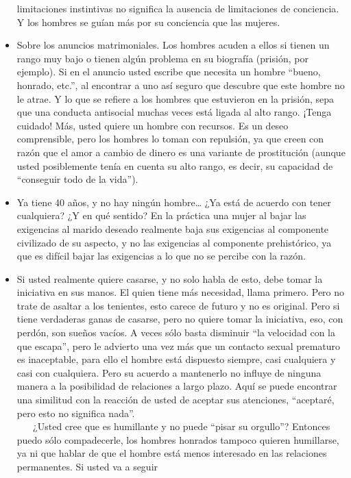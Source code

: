 \begin{itemize}
  limitaciones instintivas no significa la ausencia de limitaciones de
  conciencia. Y los hombres se guían más por su conciencia que las
  mujeres.
\item
  Sobre los anuncios matrimoniales. Los hombres acuden a ellos si tienen
  un rango muy bajo o tienen algún problema en su biografía (prisión,
  por ejemplo). Si en el anuncio usted escribe que necesita un hombre
  ``bueno, honrado, etc.'', al encontrar a uno así seguro que descubre
  que este hombre no le atrae. Y lo que se refiere a los hombres que
  estuvieron en la prisión, sepa que una conducta antisocial muchas
  veces está ligada al alto rango. ¡Tenga cuidado! Más, usted quiere un
  hombre con recursos. Es un deseo comprensible, pero los hombres lo
  toman con repulsión, ya que creen con razón que el amor a cambio de
  dinero es una variante de prostitución (aunque usted posiblemente
  tenía en cuenta su alto rango, es decir, su capacidad de ``conseguir
  todo de la vida'').
\item
  Ya tiene 40 años, y no hay ningún hombre\ldots{} ¿Ya está de acuerdo
  con tener cualquiera? ¿Y en qué sentido? En la práctica una mujer al
  bajar las exigencias al marido deseado realmente baja sus exigencias
  al componente civilizado de su aspecto, y no las exigencias al
  componente prehistórico, ya que es difícil bajar las exigencias a lo
  que no se percibe con la razón.
\item
  Si usted realmente quiere casarse, y no solo habla de esto, debe tomar
  la iniciativa en sus manos. El quien tiene más necesidad, llama
  primero. Pero no trate de asaltar a los tenientes, esto carece de
  futuro y no es original. Pero si tiene verdaderas ganas de casarse,
  pero no quiere tomar la iniciativa, eso, con perdón, son sueños
  vacíos. A veces sólo basta disminuir ``la velocidad con la que
  escapa'', pero le advierto una vez más que un contacto sexual
  prematuro es inaceptable, para ello el hombre está dispuesto siempre,
  casi cualquiera y casi con cualquiera. Pero su acuerdo a mantenerlo no
  influye de ninguna manera a la posibilidad de relaciones a largo
  plazo. Aquí se puede encontrar una similitud con la reacción de usted
  de aceptar sus atenciones, ``aceptaré, pero esto no significa nada''.\\
  \hspace*{0.333em} ~ ~ ¿Usted cree que es humillante y no puede ``pisar
  su orgullo''? Entonces puedo sólo compadecerle, los hombres honrados
  tampoco quieren humillarse, ya ni que hablar de que el hombre está
  menos interesado en las relaciones permanentes. Si usted va a seguir

\end{itemize}
